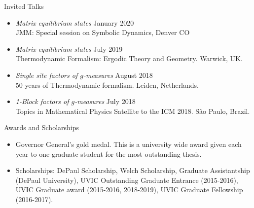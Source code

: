 \documentclass{resume} %
\begin{document}
\begin{rSection}{Invited Talks}

\begin{itemize}
	\item 
	\emph{Matrix equilibrium states} \hfill January 2020\\
	JMM: Special session on Symbolic Dynamics, Denver CO
	
	\item 
	\emph{Matrix equilibrium states} \hfill July 2019\\
	Thermodynamic Formalism: Ergodic Theory and Geometry. Warwick, UK.
	
	\item 
	\emph{Single site factors of $g$-measures} \hfill August 2018\\
	50 years of Thermodynamic formalism. Leiden, Netherlands.
	
	\item 
	\emph{1-Block factors of $g$-measures} \hfill July 2018\\
	Topics in Mathematical Physics Satellite to the ICM 2018. S\~ao Paulo, Brazil.
	
\end{itemize}

\end{rSection}


\begin{rSection}{Awards and Scholarships}

\begin{itemize}
	\item 
	Governor General's gold medal. This is a university wide award given each year to one graduate student for the most outstanding thesis.
	
	\item
	Scholarships: DePaul Scholarship, Welch Scholarship, Graduate Assistantship (DePaul University), UVIC Outstanding Graduate Entrance (2015-2016), UVIC Graduate award (2015-2016, 2018-2019), UVIC Graduate Fellowship (2016-2017).
\end{itemize}

\end{rSection}
\end{document}
